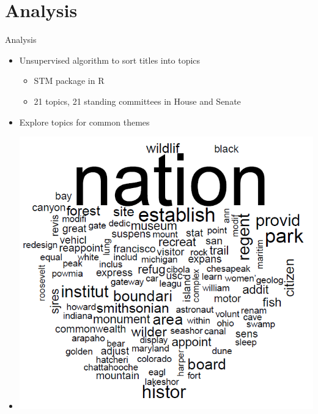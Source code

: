 \documentclass[12pt]{beamer}
\begin{document}
\section{Analysis}
\begin{frame}{Analysis}
	\begin{itemize}
		\item Unsupervised algorithm to sort titles into topics
		\begin{itemize}
			\item STM package in R
			\item 21 topics, 21 standing committees in House and 						Senate
		\end{itemize}
		\item Explore topics for common themes
		\item \includegraphics[scale=.4]{wordcloud.png}
	\end{itemize}
\end{frame}
\end{document}
